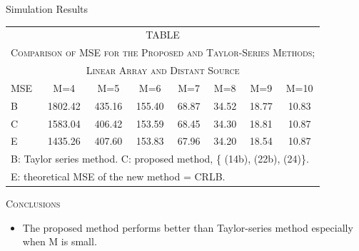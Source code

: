 \documentclass[10pt]{beamer}
\begin{document}
\begin{frame}{Simulation Results}
  \begin{center}
  \begin{tabular}{l c c c c c c c}\\
  \multicolumn{8}{c}{TABLE \uppercase\expandafter{\romannumeral4}}\\
  \multicolumn{8}{c}{\textsc{\tiny Comparison of MSE for the Proposed and Taylor-Series Methods;}}\\
  \multicolumn{8}{c}{\textsc{\tiny Linear Array and Distant Source}}\\\hline
  \scriptsize MSE & \scriptsize  M=4     &  \scriptsize M=5   & \scriptsize  M=6   & \scriptsize  M=7   &  \scriptsize M=8   &  \scriptsize M=9   &  \scriptsize  M=10   \\\hline
  \scriptsize B   &  \scriptsize 1802.42 &  \scriptsize 435.16&  \scriptsize 155.40&  \scriptsize 68.87 &  \scriptsize 34.52 &  \scriptsize 18.77  &  \scriptsize 10.83    \\
  \scriptsize C   &  \scriptsize 1583.04 &  \scriptsize 406.42&  \scriptsize 153.59&  \scriptsize 68.45 &  \scriptsize 34.30 &  \scriptsize 18.81 &  \scriptsize  10.87  \\
  \scriptsize E   &  \scriptsize 1435.26 &   \scriptsize407.60 &  \scriptsize153.83 &  \scriptsize 67.96 &  \scriptsize 34.20 &  \scriptsize18.54 &  \scriptsize 10.87 \\\hline
  \multicolumn{8}{l}{\tiny B: Taylor series method. C: proposed method, \{ (14b), (22b), (24)\}.}\\
  \multicolumn{8}{l}{\tiny E: theoretical MSE of the new method = CRLB.}
  \end{tabular}
  \end{center}
  \begin{center} \textsc{Conclusions} \end{center}
  \begin{itemize}
		\item \small The proposed method performs better than Taylor-series method especially when M is small.
	\end{itemize}

\end{frame}
\end{document}

